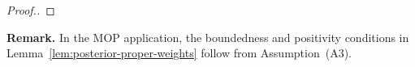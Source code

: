 \documentclass[11pt]{article}
\newcommand\refAssumpBoundedMeasurement{(A3)} %
\theoremstyle{thmstylethree}%
\begin{document}
\begin{proof}[Proof.]
    

\end{proof}


\noindent\textbf{Remark.} In the MOP application, the boundedness and positivity conditions in Lemma~\ref{lem:posterior-proper-weights} follow from Assumption~\refAssumpBoundedMeasurement.
\end{document}
